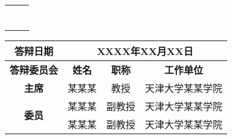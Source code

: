 \begin{titlepage}
	\vspace*{0.8cm}
	\begin{center}
		\vspace*{2cm}
		
		\begin{center}
			\renewcommand{\baselinestretch}{1.5} %
			\songti{}\textbf{\@ctitle} %
			\renewcommand{\baselinestretch}{1.5} %
		\end{center}
		
		\vspace*{1cm}
		
		\begin{center}
			\renewcommand{\baselinestretch}{1.5} %
			\songti{}\textbf{\@etitle}  %
			\renewcommand{\baselinestretch}{1.5} %
		\end{center}
		
		\vspace*{1cm}
		
		{\songti{}
			\renewcommand\arraystretch{1.2} 
			\begin{tabular}{p{3cm}@{：}l}
				\@csubjecttitle & \qquad\@csubject \\
				\cline{2-2} 
			    \@cauthortitle& \qquad\@cauthor \\
				\cline{2-2} 
				\@csupervisortitle & \qquad\@csupervisor\qquad\ \\
				\cline{2-2} 
			\end{tabular}
		}

		\vspace*{1cm}
		
		{\songti\zihao{4}
	\renewcommand\arraystretch{1.2} 
	\setlength{\tabcolsep}{1em} %
	\begin{tabular}{|c|c|c|c|}
		\hline 
		\textbf{答辩日期} & \multicolumn{3}{c|}{XXXX年XX月XX日}\tabularnewline
		\hline 
		\textbf{答辩委员会} & \textbf{姓名} & \textbf{职称} & \textbf{\qquad 工作单位 \qquad\qquad}\tabularnewline
		\hline 
		\textbf{主席} & 某某某 & 教授 & 天津大学某某学院 \tabularnewline
		\hline 
		\multirow{2}{*}{\textbf{委员}} &某某某  &副教授  & 天津大学某某学院 \tabularnewline
		\cline{2-4} \cline{3-4} \cline{4-4} 
		& 某某某 & 副教授 & 天津大学某某学院 \tabularnewline
		\hline 
	\end{tabular}
}

	\vspace*{1cm}
		\songti{}\@caffil \\
		\songti{}\@cdate
	\end{center}
	
\end{titlepage}

